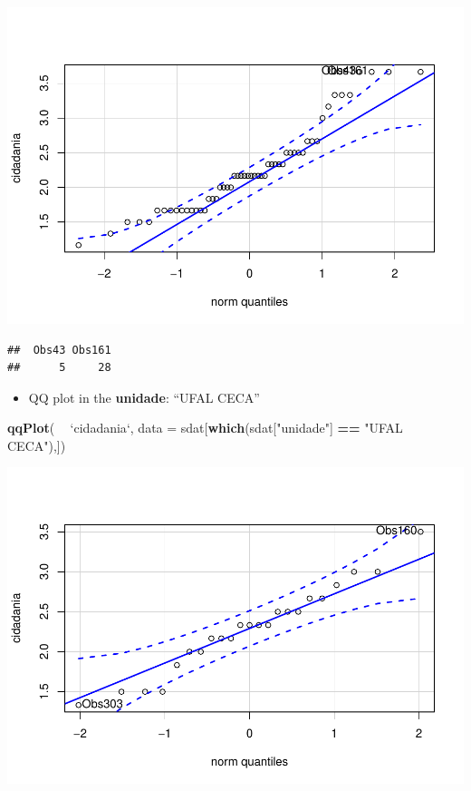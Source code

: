 \documentclass[]{article}
\newenvironment{Shaded}{\begin{snugshade}}{\end{snugshade}}
\newcommand{\DataTypeTok}[1]{\textcolor[rgb]{0.13,0.29,0.53}{#1}}
\newcommand{\KeywordTok}[1]{\textcolor[rgb]{0.13,0.29,0.53}{\textbf{#1}}}
\newcommand{\NormalTok}[1]{#1}
\newcommand{\OperatorTok}[1]{\textcolor[rgb]{0.81,0.36,0.00}{\textbf{#1}}}
\newcommand{\StringTok}[1]{\textcolor[rgb]{0.31,0.60,0.02}{#1}}
\providecommand{\tightlist}{%
  \setlength{\itemsep}{0pt}\setlength{\parskip}{0pt}}
\begin{document}
\includegraphics{factorialAnova_files/figure-latex/unnamed-chunk-18-1.pdf}

\begin{verbatim}
##  Obs43 Obs161 
##      5     28
\end{verbatim}

\begin{itemize}
\tightlist
\item
  QQ plot in the \textbf{unidade}: ``UFAL CECA''
\end{itemize}

\begin{Shaded}
\begin{Highlighting}[]
\KeywordTok{qqPlot}\NormalTok{( }\OperatorTok{~}\StringTok{ `}\DataTypeTok{cidadania}\StringTok{`}\NormalTok{, }\DataTypeTok{data =}\NormalTok{ sdat[}\KeywordTok{which}\NormalTok{(sdat[}\StringTok{"unidade"}\NormalTok{] }\OperatorTok{==}\StringTok{ "UFAL CECA"}\NormalTok{),])}
\end{Highlighting}
\end{Shaded}

\includegraphics{factorialAnova_files/figure-latex/unnamed-chunk-19-1.pdf}
\end{document}

